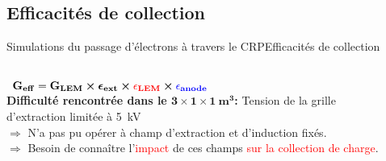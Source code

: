     \subsection{Efficacités de collection}

    \begin{frame}{Simulations du passage d'électrons à travers le CRP}{Efficacités de collection}
    	\begin{scriptsize}
    		\begin{columns}
    			\hspace{-1.5cm}
	    		\begin{column}{0.3\textwidth}
	    			\vspace{-2.5cm}
	    			\hbox{
	    				$\mathbf{G_{eff}=G_{LEM}\boldsymbol{\times}\boldsymbol{\epsilon}_{ext} \boldsymbol{\times}\textcolor{red}{\epsilon_{LEM}}\boldsymbol{\times} \textcolor{blue}{\epsilon_{anode}}}$
	    			}\\
	    			\vspace{1.3cm}
	    			\textbf{Difficulté rencontrée dans le $\mathbf{3 \times 1 \times \SI[detect-weight]{1}{\meter\cubed}}$:} Tension de la grille d'extraction limitée à \SI{5}{\kilo\volt}\\
	    			\vspace{0.3cm}
	    			$\Rightarrow$ N'a pas pu opérer à champ d'extraction et d'induction fixés.\\
	    			$\Rightarrow$ Besoin de connaître l'\textcolor{red}{impact} de ces champs \textcolor{red}{sur la collection de charge}.\\
	    			\vfill
	    		\end{column}\hfill\hspace{-3.2cm}
	    		\begin{column}{0.65\textwidth}

\end{column}
\end{columns}
\end{scriptsize}
\end{frame}
